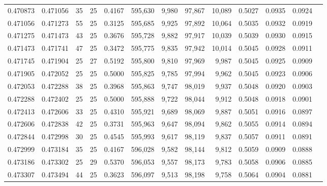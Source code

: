 \begin{tabular}{rrrrrrrrrrrrr}
0.470873 & 0.471056 &    35 &  25 &                                     0.4167 & 595,630 &   9,980 &  97,867 &  10,089 & 0.5027 & 0.0935 & 0.0924 \\
0.471056 & 0.471273 &    55 &  25 &                                     0.3125 & 595,685 &   9,925 &  97,892 &  10,064 & 0.5035 & 0.0932 & 0.0919 \\
0.471275 & 0.471473 &    43 &  25 &                                     0.3676 & 595,728 &   9,882 &  97,917 &  10,039 & 0.5039 & 0.0930 & 0.0915 \\
0.471473 & 0.471741 &    47 &  25 &                                     0.3472 & 595,775 &   9,835 &  97,942 &  10,014 & 0.5045 & 0.0928 & 0.0911 \\
0.471745 & 0.471904 &    25 &  27 &                                     0.5192 & 595,800 &   9,810 &  97,969 &   9,987 & 0.5045 & 0.0925 & 0.0909 \\
0.471905 & 0.472052 &    25 &  25 &                                     0.5000 & 595,825 &   9,785 &  97,994 &   9,962 & 0.5045 & 0.0923 & 0.0906 \\
0.472053 & 0.472288 &    38 &  25 &                                     0.3968 & 595,863 &   9,747 &  98,019 &   9,937 & 0.5048 & 0.0920 & 0.0903 \\
0.472288 & 0.472402 &    25 &  25 &                                     0.5000 & 595,888 &   9,722 &  98,044 &   9,912 & 0.5048 & 0.0918 & 0.0901 \\
0.472413 & 0.472606 &    33 &  25 &                                     0.4310 & 595,921 &   9,689 &  98,069 &   9,887 & 0.5051 & 0.0916 & 0.0897 \\
0.472606 & 0.472838 &    42 &  25 &                                     0.3731 & 595,963 &   9,647 &  98,094 &   9,862 & 0.5055 & 0.0914 & 0.0894 \\
0.472844 & 0.472998 &    30 &  25 &                                     0.4545 & 595,993 &   9,617 &  98,119 &   9,837 & 0.5057 & 0.0911 & 0.0891 \\
0.472999 & 0.473184 &    35 &  25 &                                     0.4167 & 596,028 &   9,582 &  98,144 &   9,812 & 0.5059 & 0.0909 & 0.0888 \\
0.473186 & 0.473302 &    25 &  29 &                                     0.5370 & 596,053 &   9,557 &  98,173 &   9,783 & 0.5058 & 0.0906 & 0.0885 \\
0.473307 & 0.473494 &    44 &  25 &                                     0.3623 & 596,097 &   9,513 &  98,198 &   9,758 & 0.5064 & 0.0904 & 0.0881 \\

\end{tabular}
